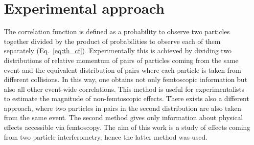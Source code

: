   \section{Experimental approach}
  \label{sec:exp-approach}
    The correlation function is defined as a probability to observe two particles together divided by the product of probabilities to observe each of them separately (Eq.~\ref{eq:th_cf}). 
    Experimentally this is achieved by dividing two distributions of relative momentum of pairs of particles coming from the same event and the equivalent distribution of pairs where each particle is taken from different collisions.
    In this way, one obtains not only femtoscopic information but also all other event-wide correlations.
    This method is useful for experimentalists to estimate the magnitude of non-femtoscopic effects.
    There exists also a different approach, where two particles in pairs in the second distribution are also taken from the same event.
    The second method gives only information about physical effects accessible via femtoscopy.
    The aim of this work is a study of effects coming from two particle interferometry, hence the latter method was used. 

